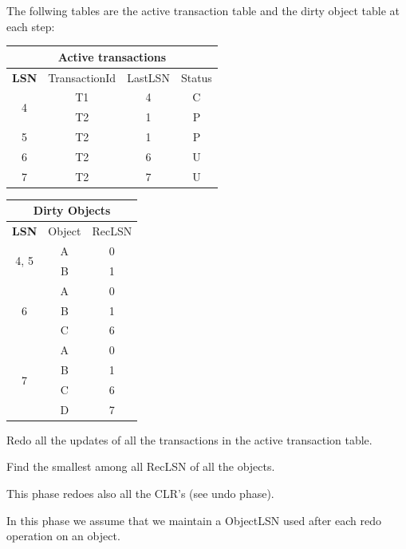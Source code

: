 \documentclass{beamer}
\begin{document}
\begin{slide}{
	\item The follwing tables are the active transaction table and the dirty object table at each step:
	
	\begin{table}
		\tiny
		\begin{tabular}{|c|c|c|c|}
			\hline
			\multicolumn{4}{|c|}{\textbf{Active transactions}} \\
			\hline
			\textbf{LSN} & TransactionId & LastLSN & Status \\
			\hline
			\multirow{2}{*}{4} & T1 & 4 & C \\
			& T2 & 1 & P \\
			\hline
			5 & T2 & 1 & P \\ 
			\hline
			6 & T2 & 6 & U \\
			\hline
			7 & T2 & 7 & U \\
			\hline
		\end{tabular}
	\end{table}
	
	\begin{table}
		\tiny
		\begin{tabular}{|c|c|c|}
			\hline
			\multicolumn{3}{|c|}{\textbf{Dirty Objects}} \\
			\hline
			\textbf{LSN} & Object & RecLSN \\
			\hline
			\multirow{2}{*}{4, 5} & A & 0 \\
			& B & 1 \\
			\hline
			\multirow{3}{*}{6} & A & 0 \\
			& B & 1 \\
			& C & 6 \\
			\hline
			\multirow{4}{*}{7} & A & 0 \\
			& B & 1 \\
			& C & 6 \\
			& D & 7 \\
			\hline
		\end{tabular}
	\end{table}
}\end{slide}

\begin{slide}{
	\item Redo all the updates of all the transactions in the active transaction table.
	\item Find the smallest among all RecLSN of all the objects.
	\item This phase redoes also all the CLR's (see undo phase).
	\item In this phase we assume that we maintain a ObjectLSN used after each redo operation on an object. 
}\end{slide}
\end{document}
